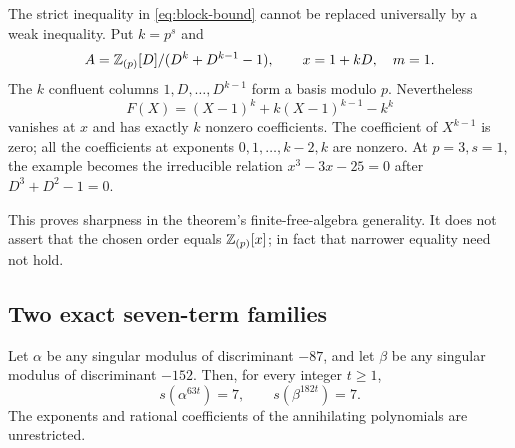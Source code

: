 The strict inequality in \eqref{eq:block-bound} cannot be replaced universally by a weak inequality. Put $k=p^s$ and
\[
 A=\mathbb Z_{(p)}[D]/(D^k+D^{k-1}-1),\qquad x=1+kD,\quad m=1.
\]
The $k$ confluent columns $1,D,\ldots,D^{k-1}$ form a basis modulo $p$. Nevertheless
\[
 F(X)=(X-1)^k+k(X-1)^{k-1}-k^k
\]
vanishes at $x$ and has exactly $k$ nonzero coefficients. The coefficient of $X^{k-1}$ is zero; all the coefficients at exponents $0,1,\ldots,k-2,k$ are nonzero. At $p=3,s=1$, the example becomes the irreducible relation $x^3-3x-25=0$ after $D^3+D^2-1=0$.

This proves sharpness in the theorem's finite-free-algebra generality. It does not assert that the chosen order equals $\mathbb Z_{(p)}[x]$; in fact that narrower equality need not hold.

\subsection{Two exact seven-term families}

\begin{theorem}\label{thm:powered}
Let $\alpha$ be any singular modulus of discriminant $-87$, and let $\beta$ be any singular modulus of discriminant $-152$. Then, for every integer $t\ge1$,
\[
                     s(\alpha^{63t})=7,\qquad
                     s(\beta^{182t})=7.
\]
The exponents and rational coefficients of the annihilating polynomials are unrestricted.
\end{theorem}

